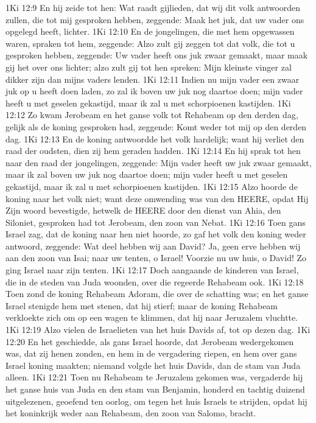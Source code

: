 1Ki 12:9  En hij zeide tot hen: Wat raadt gijlieden, dat wij dit volk antwoorden zullen, die tot mij gesproken hebben, zeggende: Maak het juk, dat uw vader ons opgelegd heeft, lichter.
1Ki 12:10  En de jongelingen, die met hem opgewassen waren, spraken tot hem, zeggende: Alzo zult gij zeggen tot dat volk, die tot u gesproken hebben, zeggende: Uw vader heeft ons juk zwaar gemaakt, maar maak gij het over ons lichter; alzo zult gij tot hen spreken: Mijn kleinste vinger zal dikker zijn dan mijns vaders lenden.
1Ki 12:11  Indien nu mijn vader een zwaar juk op u heeft doen laden, zo zal ik boven uw juk nog daartoe doen; mijn vader heeft u met geselen gekastijd, maar ik zal u met schorpioenen kastijden.
1Ki 12:12  Zo kwam Jerobeam en het ganse volk tot Rehabeam op den derden dag, gelijk als de koning gesproken had, zeggende: Komt weder tot mij op den derden dag.
1Ki 12:13  En de koning antwoordde het volk hardelijk; want hij verliet den raad der oudsten, dien zij hem geraden hadden.
1Ki 12:14  En hij sprak tot hen naar den raad der jongelingen, zeggende: Mijn vader heeft uw juk zwaar gemaakt, maar ik zal boven uw juk nog daartoe doen; mijn vader heeft u met geselen gekastijd, maar ik zal u met schorpioenen kastijden.
1Ki 12:15  Alzo hoorde de koning naar het volk niet; want deze omwending was van den HEERE, opdat Hij Zijn woord bevestigde, hetwelk de HEERE door den dienst van Ahia, den Siloniet, gesproken had tot Jerobeam, den zoon van Nebat.
1Ki 12:16  Toen gans Israel zag, dat de koning naar hen niet hoorde, zo gaf het volk den koning weder antwoord, zeggende: Wat deel hebben wij aan David? Ja, geen erve hebben wij aan den zoon van Isai; naar uw tenten, o Israel! Voorzie nu uw huis, o David! Zo ging Israel naar zijn tenten.
1Ki 12:17  Doch aangaande de kinderen van Israel, die in de steden van Juda woonden, over die regeerde Rehabeam ook.
1Ki 12:18  Toen zond de koning Rehabeam Adoram, die over de schatting was; en het ganse Israel stenigde hem met stenen, dat hij stierf; maar de koning Rehabeam verkloekte zich om op een wagen te klimmen, dat hij naar Jeruzalem vluchtte.
1Ki 12:19  Alzo vielen de Israelieten van het huis Davids af, tot op dezen dag.
1Ki 12:20  En het geschiedde, als gans Israel hoorde, dat Jerobeam wedergekomen was, dat zij henen zonden, en hem in de vergadering riepen, en hem over gans Israel koning maakten; niemand volgde het huis Davids, dan de stam van Juda alleen.
1Ki 12:21  Toen nu Rehabeam te Jeruzalem gekomen was, vergaderde hij het ganse huis van Juda en den stam van Benjamin, honderd en tachtig duizend uitgelezenen, geoefend ten oorlog, om tegen het huis Israels te strijden, opdat hij het koninkrijk weder aan Rehabeam, den zoon van Salomo, bracht.

